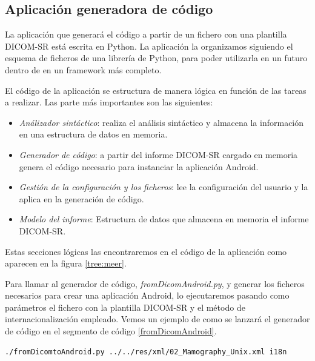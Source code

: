 \subsection{Aplicación generadora de código}
La aplicación que generará el código a partir de un fichero con una plantilla DICOM-SR está escrita en Python. La aplicación la organizamos siguiendo el esquema de ficheros de una librería de Python, para poder utilizarla en un futuro dentro de en un framework más completo. \par
El código de la aplicación se estructura de manera lógica en función de las tareas a realizar. Las parte más importantes son las siguientes:
\begin{itemize}
\item\emph{Análizador sintáctico}: realiza el análisis sintáctico y almacena la información en una estructura de datos en memoria.
\item\emph{Generador de código}: a partir del informe DICOM-SR cargado en memoria genera el código necesario para instanciar la aplicación Android.
\item\emph{Gestión de la configuración y los ficheros}: lee la configuración del usuario y la aplica en la generación de código.
\item\emph{Modelo del informe}: Estructura de datos que almacena en memoria el informe DICOM-SR.
\end{itemize}
Estas secciones lógicas las encontraremos en el código de la aplicación como aparecen en la figura \ref{tree:meer}.\par
Para llamar al generador de código, \emph{fromDicomAndroid.py}, y generar los ficheros necesarios para crear una aplicación Android, lo ejecutaremos pasando como parámetros el fichero con la plantilla DICOM-SR y el método de internacionalización empleado. Vemos un ejemplo de como se lanzará el generador de código en el segmento de código \ref{fromDicomAndroid}.
\begin{lstlisting}[language=bash,label=fromDicomAndroid,caption=Ejecución del generador de código]
	./fromDicomtoAndroid.py ../../res/xml/02_Mamography_Unix.xml i18n    
\end{lstlisting}


